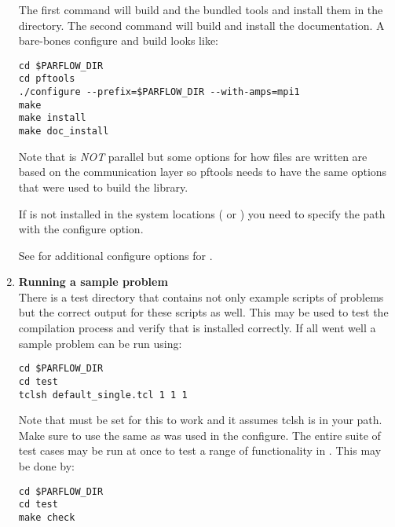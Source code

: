 \begin{enumerate}
The first command will build \parflow{} and the bundled tools and
 install them in the  directory.  The second
 command will build and install the documentation.  A bare-bones
 configure and build looks like:

\begin{display}\begin{verbatim}
cd $PARFLOW_DIR
cd pftools
./configure --prefix=$PARFLOW_DIR --with-amps=mpi1
make 
make install
make doc_install
\end{verbatim}\end{display}

Note that  is \emph{NOT} parallel but some options for
how files are written are based on the communication layer so pftools
needs to have the same options that were used to build the \parflow{}
library.

If  is not installed in the system locations ( or
) you need to specify the path with the
 configure option.

See  for additional configure options for .

\item {\bf Running a sample problem}\\ There is a test directory that
  contains not only example scripts of \parflow{} problems but the
  correct output for these scripts as well.  This may be used to test
  the compilation process and verify that \parflow{} is installed
  correctly.  If all went well a sample \parflow{} problem can be run
  using:

\begin{display}\begin{verbatim}
cd $PARFLOW_DIR
cd test
tclsh default_single.tcl 1 1 1
\end{verbatim}\end{display}

Note that  must be set for this to work and it assumes tclsh
is in your path.  Make sure to use the same  as was used in the
 configure. The entire suite of test cases may be run at once to test a range of functionality in \parflow{}.  This may be done by:
\begin{display}\begin{verbatim}
cd $PARFLOW_DIR
cd test
make check
\end{verbatim}\end{display}


\end{enumerate}
